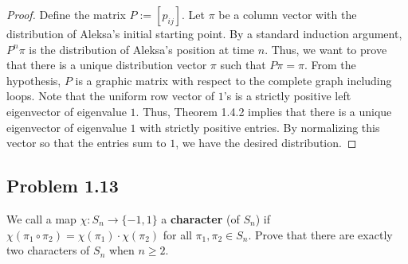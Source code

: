 \documentclass[12pt]{article}
\begin{document}
\begin{proof}
	Define the matrix $P := [p_{ij}]$. Let $\pi$ be a column vector with the distribution of Aleksa's initial starting point. By a standard induction argument, $P^{n}\pi$ is the distribution of Aleksa's position at time $n$. Thus, we want to prove that there is a unique distribution vector $\pi$ such that $P \pi = \pi$. From the hypothesis, $P$ is a graphic matrix with respect to the complete graph including loops. Note that the uniform row vector of $1$'s is a strictly positive left eigenvector of eigenvalue $1$. Thus, Theorem 1.4.2 implies that there is a unique eigenvector of eigenvalue $1$ with strictly positive entries. By normalizing this vector so that the entries sum to $1$, we have the desired distribution. 
\end{proof}

\newpage 

\subsection{Problem 1.13}

\begin{problem}
	We call a map $\chi : S_n \to \{-1, 1\}$ a \textbf{character} (of $S_n$) if $\chi(\pi_1 \circ \pi_2) = \chi(\pi_1) \cdot \chi(\pi_2)$ for all $\pi_1, \pi_2 \in S_n$. Prove that there are exactly two characters of $S_n$ when $n \geq 2$.
\end{problem}
\end{document}
